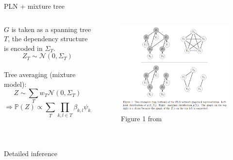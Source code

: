 \documentclass[9pt]{beamer}
\newcommand{\emphase}[1]{\textcolor{Complement}{#1}}
\newcommand{\bleu}[1]{\textcolor{Framableulight}{#1}}
\begin{document}
\begin{frame}{PLN + mixture tree}
  \begin{columns}
  \begin{column}{4.5cm}
   $G$ is taken as a spanning tree $T$, the dependency structure is encoded in $\Sigma_T$.
    \[Z_T \sim \mathcal{N}(0,\Sigma_T) \]
    \\ \bigskip
    Tree averaging (mixture model):
    \[Z \sim \sum_T w_T \mathcal{N}(0,\Sigma_T)\]
    $$\Rightarrow \mathds{P}(Z) \propto \sum_T \prod_{k,l \in T} \beta_{k,l} \psi_{k,l}(Z_T)$$ 
  \end{column}
  
  \begin{column}{7.5cm}
   \begin{figure}[htp]
   \flushleft
\includegraphics[scale=0.3]{YZgraph.png}
\caption{Figure 1 from \cite{VEM}}
\end{figure}
  \end{column}
  \end{columns}
   
  

\end{frame}
\section{}
\subsection{}
\begin{frame}{}
\begin{center}
\huge{\bleu{Detailed inference}}
\end{center}
\end{frame}
\end{document}
